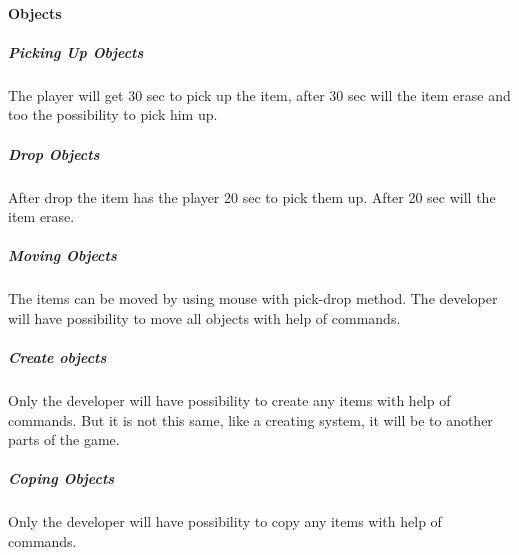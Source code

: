 \documentclass[parskip=full]{scrartcl}
\begin{document}
					\paragraph{Objects} \vspace{-5mm}
						\subparagraph{Picking Up Objects} \vspace{-5mm}
							\par \begingroup
							\leftskip=2cm
							\noindent
									The player will get 30 sec to pick up the item, after 30 sec will the item erase and too the possibility to pick him up.
							\par \endgroup
						\subparagraph{Drop Objects} \vspace{-5mm}
							\par \begingroup
							\leftskip=2cm
							\noindent
									After drop the item has the player 20 sec to pick them up. After 20 sec will the item erase.
							\par \endgroup
						\subparagraph{Moving Objects} \vspace{-5mm}
							\par \begingroup
							\leftskip=2cm
							\noindent
									The items can be moved by using mouse with pick-drop method. The developer will have possibility to move all objects with help of commands.
							\par \endgroup
						\subparagraph{Create objects} \vspace{-5mm}
							\par \begingroup
							\leftskip=2cm
							\noindent
									Only the developer  will have possibility to create any items with help of commands. But it is not this same, like a creating system, it will be to another parts of the game.
							\par \endgroup
						\subparagraph{Coping Objects} \vspace{-5mm}
							\par \begingroup
							\leftskip=2cm
							\noindent
									Only the developer  will have possibility to copy any items with help of commands.
							\par \endgroup
\end{document}
